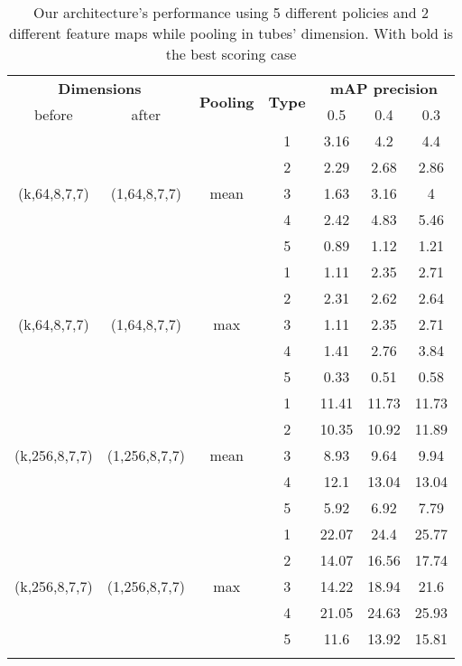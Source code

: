 \begin{center}
\begin{longtable}{||c | c | c| c||c c c||}

  \hline
  \multicolumn{2}{||c|}{\textbf{Dimensions}} & \multirow{2}{*}{ \textbf{Pooling}} &\multirow{2}{*}{\textbf{Type}} & \multicolumn{3}{|c||}{\textbf{mAP precision}}\\

   before & after &  {} & {} &  0.5 &  0.4 & 0.3 \\
 \hline   \hline
 \multirow{5}{*}{(k,64,8,7,7)} & \multirow{5}{*}{(1,64,8,7,7)} & \multirow{5}{*}{mean}  & 1 &  3.16 & 4.2 & 4.4    \\
  \cline{4-7}
  {} & {} & {} & 2 & 2.29 & 2.68 & 2.86    \\
    \cline{4-7}
  {} & {} & {} & 3 & 1.63 & 3.16 &  4  \\
    \cline{4-7}
  {} & {} & {} & 4 & 2.42 & 4.83 & 5.46  \\  
    \cline{4-7}
  {} & {} & {} & 5 & 0.89 &1.12 & 1.21  \\
  \hline
 \multirow{5}{*}{(k,64,8,7,7)} & \multirow{5}{*}{(1,64,8,7,7)} & \multirow{5}{*}{max}  & 1 & 1.11 & 2.35 & 2.71 \\
    \cline{4-7}
  {} & {} & {} & 2 & 2.31 & 2.62 & 2.64 \\
    \cline{4-7}
  {} & {} & {} & 3 & 1.11 & 2.35 & 2.71 \\
    \cline{4-7}
  {} & {} & {} & 4 & 1.41 & 2.76 & 3.84  \\
    \cline{4-7}
  {} & {} & {} & 5 & 0.33 & 0.51 &0.58  \\

  \hline   \hline

 \multirow{5}{*}{(k,256,8,7,7)} & \multirow{5}{*}{(1,256,8,7,7)} & \multirow{5}{*}{mean}  & 1 &  11.41 & 11.73 & 11.73 \\

    \cline{4-7}
  {} & {} & {} & 2 & 10.35 & 10.92 &11.89 \\
    \cline{4-7}
  {} & {} & {} & 3 & 8.93 & 9.64 & 9.94 \\
    \cline{4-7}
  {} & {} & {} & 4 & 12.1 & 13.04 &13.04 \\
    \cline{4-7}
  {} & {} & {} & 5 & 5.92 & 6.92 & 7.79 \\
    \hline
 \multirow{5}{*}{(k,256,8,7,7)} & \multirow{5}{*}{(1,256,8,7,7)} & \multirow{5}{*}{max}  & 1  & 22.07 & 24.4 & 25.77  \\
    \cline{4-7}
  {} & {} & {} & 2  & 14.07 & 16.56 & 17.74 \\
    \cline{4-7}
  {} & {} & {} & 3  & 14.22 & 18.94 &21.6 \\
    \cline{4-7}
  {} & {} & {} & 4  & 21.05 & 24.63 & 25.93 \\
    \cline{4-7}
  {} & {} & {} & 5  & 11.6 & 13.92 & 15.81 \\
  \hline   
  
  \caption{Our architecture's performance using 5 different policies and 2 different feature maps while pooling in
  tubes' dimension. With bold is the best scoring case}
  \label{table:svm_first_results}

\end{longtable} 
\end{center}

